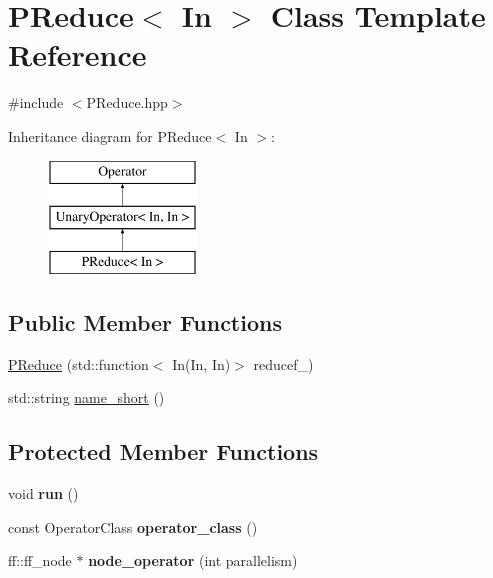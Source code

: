 \hypertarget{class_p_reduce}{\section{\-P\-Reduce$<$ \-In $>$ \-Class \-Template \-Reference}
\label{class_p_reduce}
}


{\ttfamily \#include $<$\-P\-Reduce.\-hpp$>$}

\-Inheritance diagram for \-P\-Reduce$<$ \-In $>$\-:\begin{figure}[H]
\begin{center}
\leavevmode
\includegraphics[height=3.000000cm]{class_p_reduce}
\end{center}
\end{figure}
\subsection*{\-Public \-Member \-Functions}
\begin{DoxyCompactItemize}
\item 
\hyperlink{class_p_reduce_a31e0899ba12232bd9d629281a145c219}{\-P\-Reduce} (std\-::function$<$ \-In(\-In, \-In)$>$ reducef\-\_\-)
\item 
std\-::string \hyperlink{class_p_reduce_aeec2fa6ffc97684cc42b6dda26d498d4}{name\-\_\-short} ()
\end{DoxyCompactItemize}
\subsection*{\-Protected \-Member \-Functions}
\begin{DoxyCompactItemize}
\item 
\hypertarget{class_p_reduce_a23d34226d830ba05591373ff0fb745b2}{void {\bfseries run} ()}\label{class_p_reduce_a23d34226d830ba05591373ff0fb745b2}

\item 
\hypertarget{class_p_reduce_af20857bc855fb223be6720efa12f0fb6}{const \-Operator\-Class {\bfseries operator\-\_\-class} ()}\label{class_p_reduce_af20857bc855fb223be6720efa12f0fb6}

\item 
\hypertarget{class_p_reduce_ad6a40901ce831039fd75b1f73d987861}{ff\-::ff\-\_\-node $\ast$ {\bfseries node\-\_\-operator} (int parallelism)}\label{class_p_reduce_ad6a40901ce831039fd75b1f73d987861}

\end{DoxyCompactItemize}
